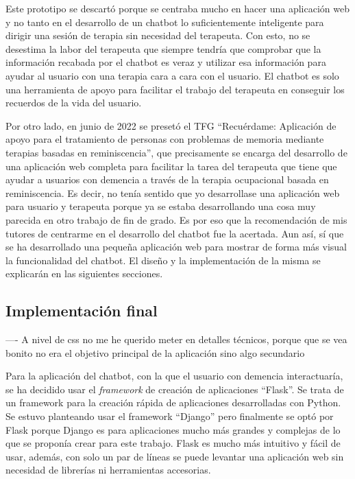 Este prototipo se descartó porque se centraba mucho en hacer una aplicación web y no tanto en el desarrollo de un chatbot lo suficientemente inteligente para dirigir una sesión de terapia sin necesidad del terapeuta. Con esto, no se desestima la labor del terapeuta que siempre tendría que comprobar que la información recabada por el chatbot es veraz y utilizar esa información para ayudar al usuario con una terapia cara a cara con el usuario. El chatbot es solo una herramienta de apoyo para facilitar el trabajo del terapeuta en conseguir los recuerdos de la vida del usuario. 

Por otro lado, en junio de 2022 se presetó el TFG ``Recuérdame: Aplicación de apoyo para el tratamiento de personas con problemas de memoria mediante terapias basadas en reminiscencia'', que precisamente se encarga del desarrollo de una aplicación web completa para facilitar la tarea del terapeuta que tiene que ayudar a usuarios con demencia a través de la terapia ocupacional basada en reminiscencia. Es decir, no tenía sentido que yo desarrollase una aplicación web para usuario y terapeuta porque ya se estaba desarrollando una cosa muy parecida en otro trabajo de fin de grado. Es por eso que la recomendación de mis tutores de centrarme en el desarrollo del chatbot fue la acertada. Aun así, sí que se ha desarrollado una pequeña aplicación web para mostrar de forma más visual la funcionalidad del chatbot. El diseño y la implementación de la misma se explicarán en las siguientes secciones.



\subsection{Implementación final}

---- A nivel de css no me he querido meter en detalles técnicos, porque que se vea bonito no era el objetivo principal de la aplicación sino algo secundario

Para la aplicación del chatbot, con la que el usuario con demencia interactuaría, se ha decidido usar el \textit{framework} de creación de aplicaciones ``Flask''. Se trata de un framework para la creación rápida de aplicaciones desarrolladas con Python. Se estuvo planteando usar el framework ``Django'' pero finalmente se optó por Flask porque Django es para aplicaciones mucho más grandes y complejas de lo que se proponía crear para este trabajo. Flask es mucho más intuitivo y fácil de usar, además, con solo un par de líneas se puede levantar una aplicación web sin necesidad de librerías ni herramientas accesorias. 

